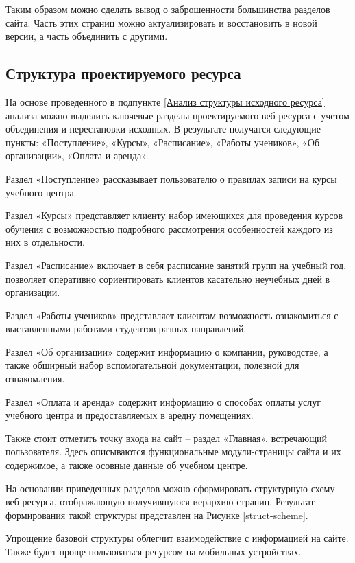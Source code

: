Таким образом можно сделать вывод о заброшенности большинства разделов сайта.
Часть этих страниц можно актуализировать и восстановить в новой версии, а часть объединить с другими.


\subsection{Структура проектируемого ресурса}

На основе проведенного в подпункте \ref{Анализ структуры исходного ресурса} анализа можно выделить ключевые разделы проектируемого веб-ресурса с учетом объединения и перестановки исходных.
В результате получатся следующие пункты: «Поступление», «Курсы», «Расписание», «Работы учеников», «Об организации», «Оплата и аренда».

Раздел «Поступление» рассказывает пользователю о правилах записи на курсы учебного центра.

Раздел «Курсы» представляет клиенту набор имеющихся для проведения курсов обучения с возможностью подробного рассмотрения особенностей каждого из них в отдельности.

Раздел «Расписание» включает в себя расписание занятий групп на учебный год, позволяет оперативно сориентировать клиентов касательно неучебных дней в организации.

Раздел «Работы учеников» представляет клиентам возможность ознакомиться с выставленными работами студентов разных направлений.

Раздел «Об организации» содержит информацию о компании, руководстве, а также обширный набор вспомогательной документации, полезной для ознакомления.

Раздел «Оплата и аренда» содержит информацию о способах оплаты услуг учебного центра и предоставляемых в аредну помещениях.

Также стоит отметить точку входа на сайт -- раздел «Главная», встречающий пользователя.
Здесь описываются функциональные модули-страницы сайта и их содержимое, а также осовные данные об учебном центре.

На основании приведенных разделов можно сформировать структурную схему веб-ресурса, отображающую получившуюся иерархию страниц.
Результат формирования такой структуры представлен на Рисунке \ref{struct-scheme}.


Упрощение базовой структуры облегчит взаимодействие с информацией на сайте.
Также будет проще пользоваться ресурсом на мобильных устройствах.


